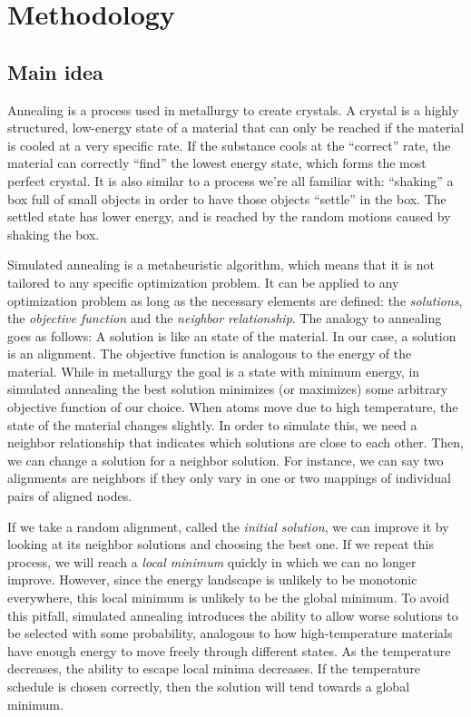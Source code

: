\documentclass{bioinfo}
\begin{document}
\section{Methodology}
\begin{methods}
\subsection{Main idea}

Annealing is a process used in metallurgy to create crystals. A crystal is a highly structured, low-energy state of a material that can only be reached if the material is cooled at a very specific rate. If the substance cools at the ``correct'' rate, the material can correctly ``find'' the lowest energy state, which forms the most perfect crystal.  It is also similar to a process we're all familiar with: ``shaking'' a box full of small objects in order to have those objects ``settle'' in the box. The settled state has lower energy, and is reached by the random motions caused by shaking the box. 

Simulated annealing is a metaheuristic algorithm, which means that it is not tailored to any specific optimization problem. It can be applied to any optimization problem as long as the necessary elements are defined: the \textit{solutions}, the \textit{objective function} and the \textit{neighbor relationship}. 
The analogy to annealing goes as follows: A solution is like an state of the material. In our case, a solution is an alignment. The objective function is analogous to the energy of the material. While in metallurgy the goal is a state with minimum energy, in simulated annealing the best solution minimizes (or maximizes) some arbitrary objective function of our choice.
When atoms move due to high temperature, the state of the material changes slightly. In order to simulate this, we need a neighbor relationship that indicates which solutions are close to each other. Then, we can change a solution for a neighbor solution. For instance, we can say two alignments are neighbors if they only vary in one or two mappings of individual pairs of aligned nodes.

If we take a random alignment, called the \textit{initial solution}, we can improve it by looking at its neighbor solutions and choosing the best one. If we repeat this process, we will reach a \textit{local minimum} quickly in which we can no longer improve. However, since the energy landscape is unlikely to be monotonic everywhere, this local minimum is unlikely to be the global minimum. To avoid this pitfall, simulated annealing introduces the ability to allow worse solutions to be selected with some probability, analogous to how high-temperature materials have enough energy to move freely through different states. As the temperature decreases, the ability to escape local minima decreases. If the temperature schedule is chosen correctly, then the solution will tend towards a global minimum.


\end{methods}
\end{document}
